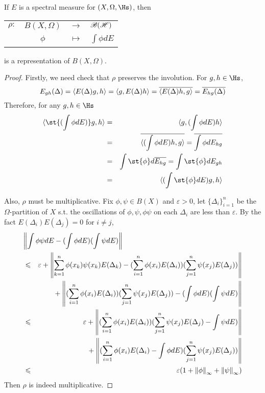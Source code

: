 \begin{prop}
	If $E$ is a spectral measure for $(X,\Omega,\Hs)$, then
	\begin{center}
		\begin{tabular}{l c c l}
			$\rho \colon$ & $B(X,\Omega)$ & $\longrightarrow$ & $\mathscr{B(H)}$ \\
			~ & $\phi$ & $\longmapsto$ & $\int \phi dE$
		\end{tabular}
	\end{center}
	is a representation of $B(X,\Omega)$.
\end{prop}
\begin{proof}
	Firstly, we need check that $\rho$ preserves the involution. For $g,h \in \Hs$,
	\begin{equation*}
		E_{gh}(\Delta) = \langle E(\Delta)g, h \rangle = \langle g, E(\Delta)h \rangle = \overline{\langle E(\Delta)h, g \rangle} = \overline{E_{hg}(\Delta)}
	\end{equation*}
	Therefore, for any $g,h \in \Hs$
	\begin{eqnarray*}
		\langle \st{(\int \phi dE)}g,h \rangle &=& \langle g, (\int \phi dE)h \rangle \\
		&=& \clo{\langle (\int \phi dE)h, g \rangle} = \clo{\int \phi dE_{hg}} \\
		&=& \int \st{\phi} d \clo{E_{hg}} = \int \st{\phi} dE_{gh} \\ 
		&=& \langle (\int \st{\phi} dE)g,h \rangle
	\end{eqnarray*}
	\item Also, $\rho$ must be multiplicative. Fix $\phi,\psi \in B(X)$ and $\varepsilon >0$, let $\{\Delta_i\}_{i=1}^{n}$ be the $\Omega$-partition of $X$ s.t. the oscillations of $\phi,\psi,\phi\psi$ on each $\Delta_i$ are less than $\varepsilon$.
	By the fact $E(\Delta_i)E(\Delta_j) = 0$ for $i \neq j$, 
	\begin{eqnarray*}
		\lefteqn{\norm{\int \phi\psi dE - (\int \phi dE)(\int \psi dE)}} \\
		&\leqslant& \varepsilon+ \norm{\sum_{k=1}^{n}\phi(x_k)\psi(x_k)E(\Delta_k) - (\sum_{i=1}^{n}\phi(x_i)E(\Delta_i))(\sum_{j=1}^{n}\psi(x_j)E(\Delta_j))} \\
		&& \negmedspace{} + \norm{(\sum_{i=1}^{n}\phi(x_i)E(\Delta_i))(\sum_{j=1}^{n}\psi(x_j)E(\Delta_j))-(\int \phi dE)(\int \psi dE)} \\
		&\leqslant& \varepsilon + \norm{(\sum_{i=1}^{n}\phi(x_i)E(\Delta_i))(\sum_{j=1}^{n}\psi(x_j)E(\Delta_j)-\int \psi dE)} \\
		&& \negmedspace{} + \norm{(\sum_{i=1}^{n}\phi(x_i)E(\Delta_i)-\int \phi dE)(\sum_{j=1}^{n}\psi(x_j)E(\Delta_j))} \\
		&\leqslant& \varepsilon(1+\norm{\phi}_{\infty}+\norm{\psi}_{\infty})
	\end{eqnarray*}
	Then $\rho$ is indeed multiplicative.
\end{proof}

